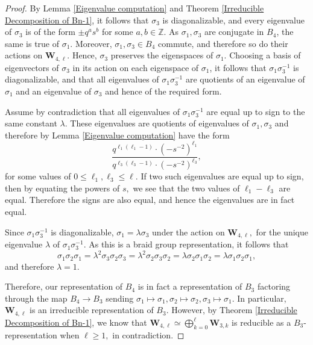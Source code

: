 \documentclass[letterpaper]{amsart}
\begin{document}
\begin{proof}
By Lemma \ref{Eigenvalue computation} and Theorem \ref{Irreducible Decomposition of Bn-1}, it follows that $\sigma_3$ is diagonalizable, and every eigenvalue of $\sigma_3$ is of the form $\pm q^as^b$ for some $a, b \in \mathbb{Z}$. As $\sigma_1, \sigma_3$ are conjugate in $B_4$, the same is true of $\sigma_1$. Moreover, $\sigma_1,\sigma_3 \in B_4$ commute, and therefore so do their actions on $\textbf{W}_{4, \ell}$. Hence, $\sigma_3$ preserves the eigenspaces of $\sigma_1$. Choosing a basis of eigenvectors of $\sigma_3$ in its action on each eigenspace of $\sigma_1$, it follows that $\sigma_1\sigma_3^{-1}$ is diagonalizable, and that all eigenvalues of $\sigma_1\sigma_3^{-1}$ are quotients of an eigenvalue of $\sigma_1$ and an eigenvalue of $\sigma_3$ and hence of the required form.

Assume by contradiction that all eigenvalues of $\sigma_1\sigma_3^{-1}$ are equal up to sign to the same constant $\lambda.$ These eigenvalues are quotients of eigenvalues of $\sigma_1, \sigma_3$ and therefore by Lemma \ref{Eigenvalue computation} have the form
$$\frac{q^{\ell_1(\ell_1-1)}\cdot(-s^{-2})^{\ell_1}}{q^{\ell_3(\ell_3-1)}\cdot(-s^{-2})^{\ell_3}},$$
for some values of $0 \leq \ell_1, \ell_3 \leq \ell.$ If two such eigenvalues are equal up to sign, then by equating the powers of $s,$ we see that the two values of $\ell_1 - \ell_3$ are equal. Therefore the signs are also equal, and hence the eigenvalues are in fact equal.

Since $\sigma_1 \sigma_3^{-1}$ is diagonalizable, $\sigma_1 = \lambda \sigma_3$ under the action on $\textbf{W}_{4, \ell},$ for the unique eigenvalue $\lambda$ of $\sigma_1\sigma_3^{-1}.$ As this is a braid group representation, it follows that
$$\sigma_1 \sigma_2 \sigma_1 = \lambda^2 \sigma_3 \sigma_2 \sigma_3 = \lambda^2 \sigma_2 \sigma_3 \sigma_2 = \lambda \sigma_2 \sigma_1 \sigma_2 = \lambda \sigma_1 \sigma_2 \sigma_1,$$
and therefore $\lambda = 1.$

Therefore, our representation of $B_4$ is in fact a representation of $B_3$ factoring through the map $B_4 \to B_3$ sending $\sigma_1 \mapsto \sigma_1, \sigma_2\mapsto \sigma_2, \sigma_3 \mapsto \sigma_1$. In particular, $\textbf{W}_{4, \ell}$ is an irreducible representation of $B_3$. However, by Theorem \ref{Irreducible Decomposition of Bn-1}, we know that $\textbf{W}_{4,\ell} \simeq \bigoplus_{k=0}^\ell \textbf{W}_{3, k}$ is reducible as a $B_3$-representation when $\ell \geq 1,$ in contradiction.
\end{proof}
\end{document}
